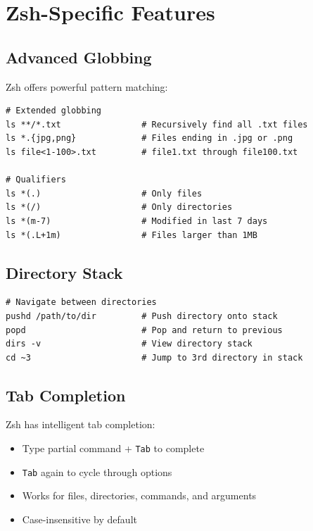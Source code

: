 \documentclass[11pt]{article}
\begin{document}
\section{Zsh-Specific Features}

\subsection{Advanced Globbing}

Zsh offers powerful pattern matching:

\begin{lstlisting}
# Extended globbing
ls **/*.txt                # Recursively find all .txt files
ls *.{jpg,png}             # Files ending in .jpg or .png
ls file<1-100>.txt         # file1.txt through file100.txt

# Qualifiers
ls *(.)                    # Only files
ls *(/)                    # Only directories
ls *(m-7)                  # Modified in last 7 days
ls *(.L+1m)                # Files larger than 1MB
\end{lstlisting}

\subsection{Directory Stack}

\begin{lstlisting}
# Navigate between directories
pushd /path/to/dir         # Push directory onto stack
popd                       # Pop and return to previous
dirs -v                    # View directory stack
cd ~3                      # Jump to 3rd directory in stack
\end{lstlisting}

\subsection{Tab Completion}

Zsh has intelligent tab completion:
\begin{itemize}
    \item Type partial command + \texttt{Tab} to complete
    \item \texttt{Tab} again to cycle through options
    \item Works for files, directories, commands, and arguments
    \item Case-insensitive by default
\end{itemize}
\end{document}
